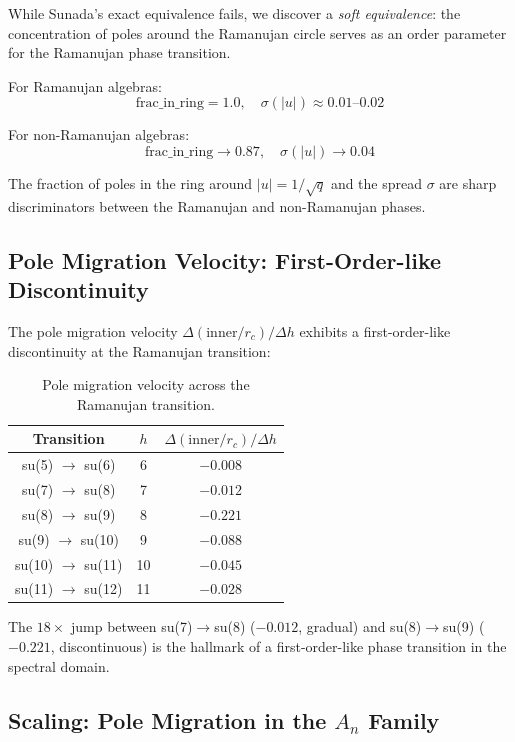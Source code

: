 While Sunada's exact equivalence fails, we discover a \emph{soft equivalence}: the concentration of poles around the Ramanujan circle serves as an order parameter for the Ramanujan phase transition.

For Ramanujan algebras:
\begin{equation}
\mathrm{frac\_in\_ring} = 1.0, \quad \sigma(|u|) \approx 0.01\text{--}0.02
\end{equation}

For non-Ramanujan algebras:
\begin{equation}
\mathrm{frac\_in\_ring} \to 0.87, \quad \sigma(|u|) \to 0.04
\end{equation}

The fraction of poles in the ring around $|u| = 1/\sqrt{q}$ and the spread $\sigma$ are sharp discriminators between the Ramanujan and non-Ramanujan phases.

\subsection{Pole Migration Velocity: First-Order-like Discontinuity}\label{sec:pole_migration}

The pole migration velocity $\Delta(\mathrm{inner}/r_c) / \Delta h$ exhibits a first-order-like discontinuity at the Ramanujan transition:

\begin{table}[h]
\centering
\begin{tabular}{c c c}
\hline\hline
Transition & $h$ & $\Delta(\mathrm{inner}/r_c)/\Delta h$ \\
\hline
su(5) $\to$ su(6) & 6 & $-0.008$ \\
su(7) $\to$ su(8) & 7 & $-0.012$ \\
su(8) $\to$ su(9) & 8 & \textbf{$-0.221$} \\
su(9) $\to$ su(10) & 9 & $-0.088$ \\
su(10) $\to$ su(11) & 10 & $-0.045$ \\
su(11) $\to$ su(12) & 11 & $-0.028$ \\
\hline\hline
\end{tabular}
\caption{Pole migration velocity across the Ramanujan transition.}
\end{table}

The $18\times$ jump between su(7)$\to$su(8) ($-0.012$, gradual) and su(8)$\to$su(9) ($-0.221$, discontinuous) is the hallmark of a first-order-like phase transition in the spectral domain.

\subsection{Scaling: Pole Migration in the $A_n$ Family}\label{sec:pole_scaling}

